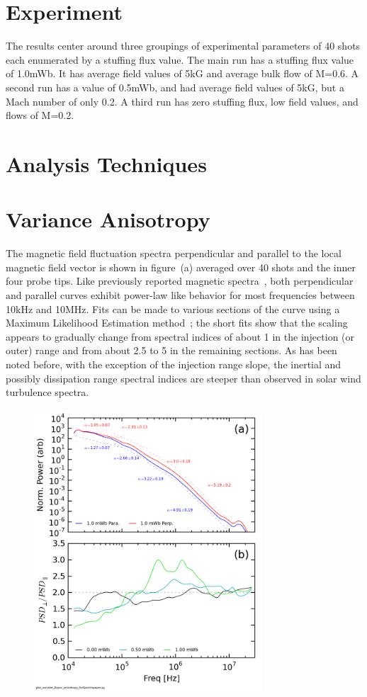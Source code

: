 \documentclass[aip,prl,amsmath,amssymb,reprint,superscriptaddress]{revtex4-1} %
\begin{document}
\section{Experiment}

The results center around three groupings of experimental parameters of 40 shots each enumerated by a stuffing flux value. The main run has a stuffing flux value of 1.0mWb. It has average field values of 5kG and average bulk flow of M=0.6. A second run has a value of 0.5mWb, and had average field values of 5kG, but a Mach number of only 0.2. A third run has zero stuffing flux, low field values, and flows of M=0.2.

\section{Analysis Techniques}

\section{Variance Anisotropy}\label{sec:variance}

The magnetic field fluctuation spectra perpendicular and parallel to the local magnetic field vector is shown in figure~\cite{fig:spectra}(a) averaged over 40 shots and the inner four probe tips. Like previously reported magnetic spectra~\cite{schaffner14}, both perpendicular and parallel curves exhibit power-law like behavior for most frequencies between 10kHz and 10MHz. Fits can be made to various sections of the curve using a Maximum Likelihood Estimation method~\cite{clauset09}; the short fits show that the scaling appears to gradually change from spectral indices of about 1 in the injection (or outer) range and from about 2.5 to 5 in the remaining sections. As has been noted before, with the exception of the injection range slope, the inertial and possibly dissipation range spectral indices are steeper than observed in solar wind turbulence spectra.

\begin{figure}[!htbp]
\centerline{
\includegraphics[width=8.5cm]{Bperppara_chan1t4_1mWbspectra_40t60us_wAsymRatio}}
\caption{\label{fig:spectra}}
\end{figure}
\end{document}
